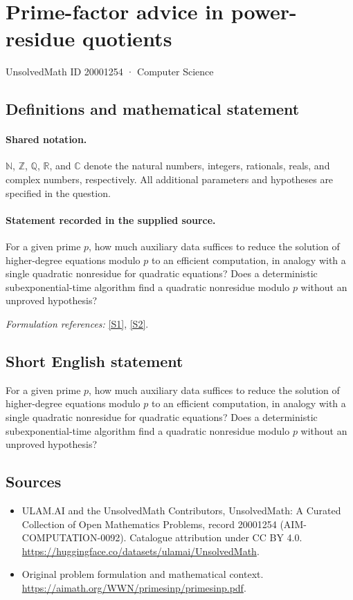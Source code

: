 \documentclass[11pt]{article}
\newcommand{\sref}[2]{\hyperlink{source:#1:#2}{[S#2]}}
\begin{document}
\setcounter{section}{20001253}
\section{Prime-factor advice in power-residue quotients}\label{20001254}
{\small UnsolvedMath ID 20001254 · Computer Science}
\subsection{Definitions and mathematical statement}

\paragraph{Shared notation.}$\mathbb N$, $\mathbb Z$, $\mathbb Q$, $\mathbb R$, and $\mathbb C$ denote the natural numbers, integers, rationals, reals, and complex numbers, respectively. All additional parameters and hypotheses are specified in the question.


\paragraph{Statement recorded in the supplied source.}
For a given prime $p$, how much auxiliary data suffices to reduce the solution of higher-degree equations modulo $p$ to an efficient computation, in analogy with a single quadratic nonresidue for quadratic equations? Does a deterministic subexponential-time algorithm find a quadratic nonresidue modulo $p$ without an unproved hypothesis?
\par\smallskip\textit{Formulation references:} \sref{20001254}{1}, \sref{20001254}{2}.
\subsection{Short English statement}
For a given prime $p$, how much auxiliary data suffices to reduce the solution of higher-degree equations modulo $p$ to an efficient computation, in analogy with a single quadratic nonresidue for quadratic equations? Does a deterministic subexponential-time algorithm find a quadratic nonresidue modulo $p$ without an unproved hypothesis?
\subsection{Sources}
\begin{itemize}
\item[\hypertarget{source:20001254:1}{S1}] ULAM.AI and the UnsolvedMath Contributors, UnsolvedMath: A Curated Collection of Open Mathematics Problems, record 20001254 (AIM-COMPUTATION-0092). Catalogue attribution under CC BY 4.0.
\url{https://huggingface.co/datasets/ulamai/UnsolvedMath}.
\item[\hypertarget{source:20001254:2}{S2}] Original problem formulation and mathematical context.
\url{https://aimath.org/WWN/primesinp/primesinp.pdf}.
\end{itemize}
\label{end:20001254}
\end{document}
